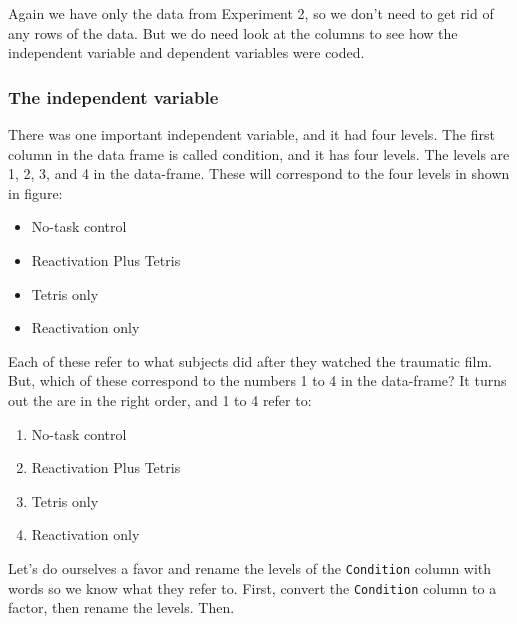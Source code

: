 \documentclass[
]{book}
\newenvironment{Shaded}{\begin{snugshade}}{\end{snugshade}}
\newcommand{\FunctionTok}[1]{\textcolor[rgb]{0.13,0.29,0.53}{\textbf{#1}}}
\newcommand{\NormalTok}[1]{#1}
\newcommand{\OtherTok}[1]{\textcolor[rgb]{0.56,0.35,0.01}{#1}}
\newcommand{\SpecialCharTok}[1]{\textcolor[rgb]{0.81,0.36,0.00}{\textbf{#1}}}
\newcommand{\StringTok}[1]{\textcolor[rgb]{0.31,0.60,0.02}{#1}}
\providecommand{\tightlist}{%
  \setlength{\itemsep}{0pt}\setlength{\parskip}{0pt}}
\begin{document}
Again we have only the data from Experiment 2, so we don't need to get rid of any rows of the data. But we do need look at the columns to see how the independent variable and dependent variables were coded.

\hypertarget{the-independent-variable}{%
\subsubsection{The independent variable}\label{the-independent-variable}}

There was one important independent variable, and it had four levels. The first column in the data frame is called condition, and it has four levels. The levels are 1, 2, 3, and 4 in the data-frame. These will correspond to the four levels in shown in figure:

\begin{itemize}
\tightlist
\item
  No-task control
\item
  Reactivation Plus Tetris
\item
  Tetris only
\item
  Reactivation only
\end{itemize}

Each of these refer to what subjects did after they watched the traumatic film. But, which of these correspond to the numbers 1 to 4 in the data-frame? It turns out the are in the right order, and 1 to 4 refer to:

\begin{enumerate}
\def\labelenumi{\arabic{enumi}.}
\tightlist
\item
  No-task control
\item
  Reactivation Plus Tetris
\item
  Tetris only
\item
  Reactivation only
\end{enumerate}

Let's do ourselves a favor and rename the levels of the \texttt{Condition} column with words so we know what they refer to. First, convert the \texttt{Condition} column to a factor, then rename the levels. Then.

\begin{Shaded}
\end{Shaded}
\end{document}
